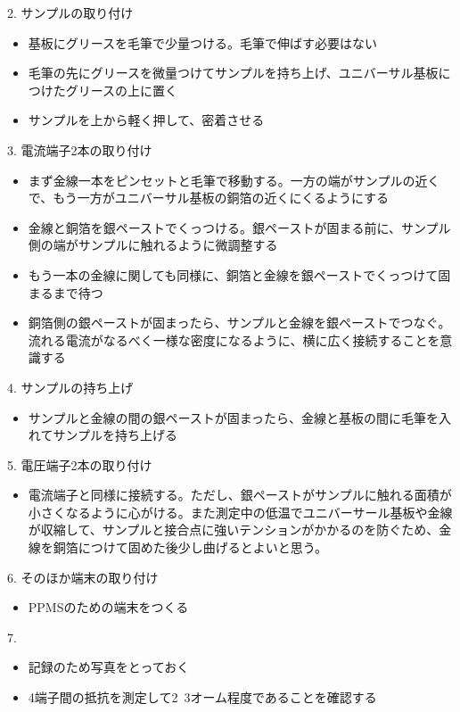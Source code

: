 \documentclass[11pt,a4paper]{jsarticle}
\begin{document}
2. サンプルの取り付け
\begin{itemize}
\item 基板にグリースを毛筆で少量つける。毛筆で伸ばす必要はない
\item 毛筆の先にグリースを微量つけてサンプルを持ち上げ、ユニバーサル基板につけたグリースの上に置く
\item サンプルを上から軽く押して、密着させる
\end{itemize}
 
3. 電流端子2本の取り付け
\begin{itemize}
\item まず金線一本をピンセットと毛筆で移動する。一方の端がサンプルの近くで、もう一方がユニバーサル基板の銅箔の近くにくるようにする
\item 金線と銅箔を銀ペーストでくっつける。銀ペーストが固まる前に、サンプル側の端がサンプルに触れるように微調整する
\item もう一本の金線に関しても同様に、銅箔と金線を銀ペーストでくっつけて固まるまで待つ
\item 銅箔側の銀ペーストが固まったら、サンプルと金線を銀ペーストでつなぐ。流れる電流がなるべく一様な密度になるように、横に広く接続することを意識する
 \end{itemize}
 
4. サンプルの持ち上げ
\begin{itemize}
\item サンプルと金線の間の銀ペーストが固まったら、金線と基板の間に毛筆を入れてサンプルを持ち上げる
 \end{itemize}
 
5. 電圧端子2本の取り付け
\begin{itemize}
\item 電流端子と同様に接続する。ただし、銀ペーストがサンプルに触れる面積が小さくなるように心がける。また測定中の低温でユニバーサール基板や金線が収縮して、サンプルと接合点に強いテンションがかかるのを防ぐため、金線を銅箔につけて固めた後少し曲げるとよいと思う。
 \end{itemize}
 
6. そのほか端末の取り付け
\begin{itemize}
\item PPMSのための端末をつくる
\end{itemize}

7. %
\begin{itemize}
\item 記録のため写真をとっておく
\item 4端子間の抵抗を測定して2~3オーム程度であることを確認する
\end{itemize}
 
\end{document}

